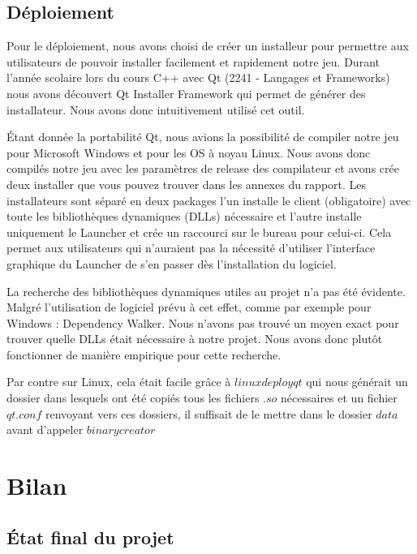 \documentclass[a4paper,10pt,openany,oneside]{report}
\begin{document}
\section{Déploiement}
Pour le déploiement, nous avons choisi de créer un installeur pour permettre aux utilisateurs de pouvoir installer  facilement et rapidement notre jeu. Durant l'année scolaire lors du cours C++ avec Qt (2241 - Langages et Frameworks) nous avons découvert Qt Installer Framework qui permet de générer des installateur. Nous avons donc intuitivement utilisé cet outil.
\newline

Étant donnée la portabilité Qt, nous avions la possibilité de compiler notre jeu pour Microsoft Windows et pour les OS à noyau Linux. Nous avons donc compilés notre jeu avec les paramètres de release des compilateur et avons crée deux installer que vous pouvez trouver dans les annexes du rapport.
Les installateurs sont séparé en deux packages l'un installe le client (obligatoire) avec toute les bibliothèques dynamiques (DLLs) nécessaire et l'autre installe uniquement le Launcher et crée un raccourci sur le bureau pour celui-ci.
Cela permet aux utilisateurs qui n'auraient pas la nécessité d'utiliser l'interface graphique du Launcher de s'en passer dès l'installation du logiciel.
\newline

La recherche des bibliothèques dynamiques utiles au projet n'a pas été évidente. Malgré l'utilisation de logiciel prévu à cet effet, comme par exemple pour Windows : Dependency Walker. Nous n'avons pas trouvé un moyen exact pour trouver quelle DLLs était nécessaire à notre projet. Nous avons donc plutôt fonctionner de manière empirique pour cette recherche.
\newline

Par contre sur Linux, cela était facile grâce à $linuxdeployqt$ qui nous générait un dossier dans lesquels ont été copiés tous les fichiers $.so$ nécessaires et un fichier $qt.conf$ renvoyant vers ces dossiers, il suffisait de le mettre dans le dossier $data$ avant d'appeler $binarycreator$



\chapter{Bilan}
\thispagestyle{headings}
\section{État final du projet}
\end{document}
